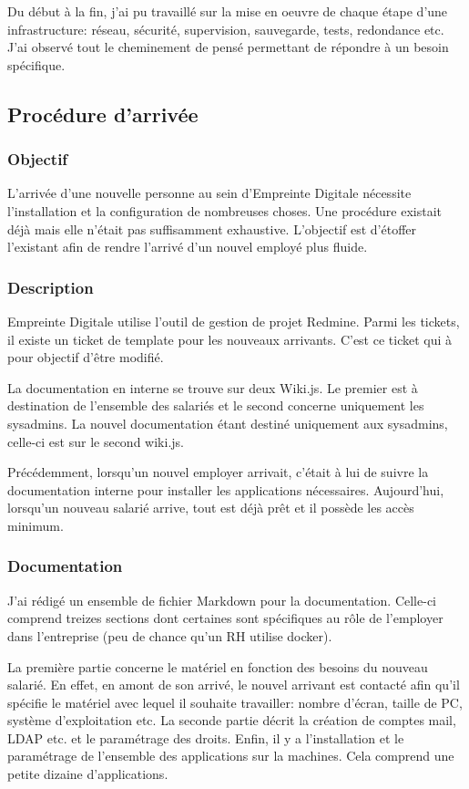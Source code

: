 \documentclass[12pt]{article}
\begin{document}
Du début à la fin, j'ai pu travaillé sur la mise en oeuvre de chaque étape d'une infrastructure: réseau, sécurité, supervision, sauvegarde, tests, redondance etc.
J'ai observé tout le cheminement de pensé permettant de répondre à un besoin spécifique.



\newpage
\subsection{Procédure d'arrivée}
\subsubsection{Objectif}
L'arrivée d'une nouvelle personne au sein d'Empreinte Digitale nécessite l'installation et la configuration de nombreuses choses.
Une procédure existait déjà mais elle n'était pas suffisamment exhaustive.
L'objectif est d'étoffer l'existant afin de rendre l'arrivé d'un nouvel employé plus fluide.

\subsubsection{Description}
Empreinte Digitale utilise l'outil de gestion de projet \gls{Redmine}.
Parmi les tickets, il existe un ticket de template pour les nouveaux arrivants.
C'est ce ticket qui à pour objectif d'être modifié.

La documentation en interne se trouve sur deux Wiki.js.
Le premier est à destination de l'ensemble des salariés et le second concerne uniquement les sysadmins.
La nouvel documentation étant destiné uniquement aux sysadmins, celle-ci est sur le second wiki.js.

Précédemment, lorsqu'un nouvel employer arrivait, c'était à lui de suivre la documentation interne pour installer les applications nécessaires.
Aujourd'hui, lorsqu'un nouveau salarié arrive, tout est déjà prêt et il possède les accès minimum. 

\subsubsection{Documentation}
J'ai rédigé un ensemble de fichier \gls{Markdown} pour la documentation. 
Celle-ci comprend treizes sections dont certaines sont spécifiques au rôle de l'employer dans l'entreprise (peu de chance qu'un RH utilise docker).

La première partie concerne le matériel en fonction des besoins du nouveau salarié.
En effet, en amont de son arrivé, le nouvel arrivant est contacté afin qu'il spécifie le matériel avec lequel il souhaite travailler: nombre d'écran, taille de PC, système d'exploitation etc.
La seconde partie décrit la création de comptes mail, LDAP etc. et le paramétrage des droits.
Enfin, il y a l'installation et le paramétrage de l'ensemble des applications sur la machines.
Cela comprend une petite dizaine d'applications.
\end{document}
